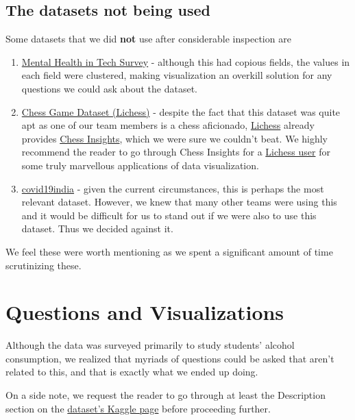 \documentclass[titlepage, 12pt]{article}
\begin{document}
\subsection{The datasets not being used}
Some datasets that we did \textbf{not} use after considerable inspection are
\begin{enumerate}

    \item\href{https://www.kaggle.com/osmi/mental-health-in-tech-survey}{Mental
        Health in Tech Survey} - although this had copious fields, the values in
        each field were clustered, making visualization an overkill solution for
        any questions we could ask about the dataset.

    \item\href{https://www.kaggle.com/datasnaek/chess}{Chess Game Dataset
        (Lichess)} - despite the fact that this dataset was quite apt as one of
        our team members is a chess aficionado,
        \href{https://lichess.org/}{Lichess} already provides
        \href{https://lichess.org/blog/VmZbaigAABACtXQC/chess-insights}{Chess
        Insights}, which we were sure we couldn't beat. We highly recommend the
        reader to go through Chess Insights for a
        \href{https://lichess.org/insights/The_Mockingbird/acpl/variant}{Lichess
        user} for some truly marvellous applications of data visualization.

    \item\href{https://github.com/covid19india/api}{covid19india} - given the
        current circumstances, this is perhaps the most relevant dataset.
        However, we knew that many other teams were using this and it would be
        difficult for us to stand out if we were also to use this dataset. Thus
        we decided against it.

\end{enumerate}
We feel these were worth mentioning as we spent a significant amount of time
scrutinizing these.

\section{Questions and Visualizations}
Although the data was surveyed primarily to study students' alcohol consumption,
we realized that myriads of questions could be asked that aren't related to
this, and that is exactly what we ended up doing.

On a side note, we request the reader to go through at least the Description
section on the
\href{https://www.kaggle.com/uciml/student-alcohol-consumption}{dataset's Kaggle
page} before proceeding further.
\end{document}

